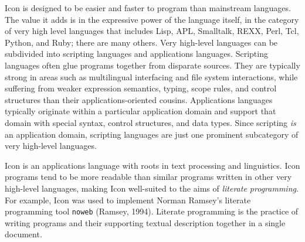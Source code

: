 Icon is designed to be easier and faster to program than mainstream
languages. The value it adds is in the expressive power of the language
itself, in the category of very high level languages
that includes Lisp,
APL, Smalltalk, REXX,
Perl, Tcl, Python, and
Ruby; there are
many others. Very high-level languages can be subdivided into
scripting languages and applications
languages. Scripting languages often glue programs
together from disparate sources. They are typically strong in areas
such as multilingual interfacing and file system interactions, while
suffering from weaker expression semantics, typing, scope rules, and
control structures than their applications-oriented cousins.
Applications languages typically originate within a particular
application domain and support that domain with special syntax, control
structures, and data types. Since scripting \textit{is} an application
domain, scripting languages are just one prominent
subcategory of very high-level languages.

Icon is an applications language with roots in text
processing and linguistics. Icon programs tend to be more readable than
similar programs written in other very high-level languages, making
Icon well-suited to the aims of \textit{literate programming}. For example, Icon was used
to implement Norman Ramsey's literate
programming tool \texttt{noweb} (Ramsey, 1994). Literate programming is
the practice of writing programs and their supporting textual
description together in a single document.

